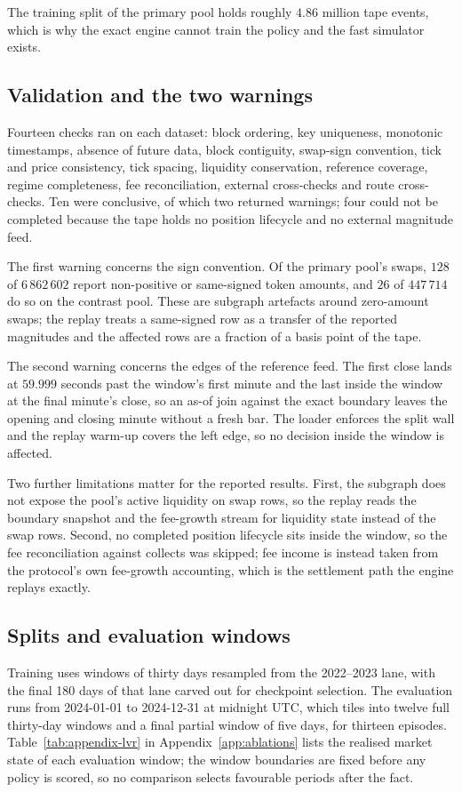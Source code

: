The training split of the primary pool holds roughly $4.86$ million tape
events, which is why the exact engine cannot train the policy and the fast
simulator exists.

\subsection{Validation and the two warnings}

Fourteen checks ran on each dataset: block ordering, key uniqueness,
monotonic timestamps, absence of future data, block contiguity, swap-sign
convention, tick and price consistency, tick spacing, liquidity conservation,
reference coverage, regime completeness, fee reconciliation, external
cross-checks and route cross-checks. Ten were conclusive, of which two
returned warnings; four could not be completed because the tape holds no
position lifecycle and no external magnitude feed.

The first warning concerns the sign convention. Of the primary pool's swaps,
$128$ of $6\,862\,602$ report non-positive or same-signed token amounts, and
$26$ of $447\,714$ do so on the contrast pool. These are subgraph artefacts
around zero-amount swaps; the replay treats a same-signed row as a transfer
of the reported magnitudes and the affected rows are a fraction of a basis
point of the tape.

The second warning concerns the edges of the reference feed. The first close
lands at $59.999$ seconds past the window's first minute and the last inside
the window at the final minute's close, so an as-of join against the exact
boundary leaves the opening and closing minute without a fresh bar. The loader
enforces the split wall and the replay warm-up covers the left edge, so no
decision inside the window is affected.

Two further limitations matter for the reported results. First, the subgraph
does not expose the pool's active liquidity on swap rows, so the replay reads
the boundary snapshot and the fee-growth stream for liquidity state instead of
the swap rows. Second, no completed position lifecycle sits inside the window,
so the fee reconciliation against collects was skipped; fee income is instead
taken from the protocol's own fee-growth accounting, which is the settlement
path the engine replays exactly.

\subsection{Splits and evaluation windows}

Training uses windows of thirty days resampled from the 2022--2023 lane, with
the final 180 days of that lane carved out for checkpoint selection. The
evaluation runs from 2024-01-01 to 2024-12-31 at midnight UTC, which tiles
into twelve full thirty-day windows and a final partial window of five days,
for thirteen episodes. Table~\ref{tab:appendix-lvr} in
Appendix~\ref{app:ablations} lists the realised market state of each evaluation
window; the window boundaries are fixed before any policy is scored, so no
comparison selects favourable periods after the fact.
